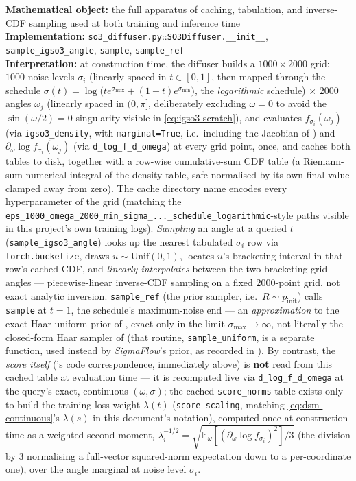 \documentclass[11pt,a4paper]{report}
\theoremstyle{definition}
\theoremstyle{remark}
\newcommand{\EE}{\mathbb E}
\newcommand{\file}[1]{\texttt{#1}}
\newcommand{\pyfunc}[1]{\texttt{#1}}
\begin{document}
\begin{codebox}
\textbf{Mathematical object:} the full apparatus of caching, tabulation,
and inverse-CDF sampling used at both training and inference time \\
\textbf{Implementation:} \file{so3\_diffuser.py}::\pyfunc{SO3Diffuser.\_\_init\_\_},
\pyfunc{sample\_igso3\_angle}, \pyfunc{sample}, \pyfunc{sample\_ref} \\
\textbf{Interpretation:} at construction time, the diffuser builds a
$1000\times2000$ grid: $1000$ noise levels $\sigma_i$ (linearly spaced in
$t\in[0,1]$, then mapped through the schedule
$\sigma(t)=\log\bigl(te^{\sigma_{\max}}+(1-t)e^{\sigma_{\min}}\bigr)$, the
\emph{logarithmic} schedule) $\times$ $2000$ angles $\omega_j$ (linearly
spaced in $(0,\pi]$, deliberately excluding $\omega=0$ to avoid the
$\sin(\omega/2)=0$ singularity visible in \eqref{eq:igso3-scratch}), and
evaluates $f_{\sigma_i}(\omega_j)$ (via \pyfunc{igso3\_density}, with
\texttt{marginal=True}, i.e.\ including the Jacobian of
) and
$\partial_{\omega}\log f_{\sigma_i}(\omega_j)$ (via
\pyfunc{d\_log\_f\_d\_omega}) at every grid point, once, and caches both
tables to disk, together with a row-wise cumulative-sum CDF table (a
Riemann-sum numerical integral of the density table, safe-normalised by
its own final value clamped away from zero). The cache directory name
encodes every hyperparameter of the grid (matching the
\texttt{eps\_1000\_omega\_2000\_min\_sigma\_...\_schedule\_logarithmic}-style
paths visible in this project's own training logs). \emph{Sampling} an
angle at a queried $t$ (\pyfunc{sample\_igso3\_angle}) looks up the nearest
tabulated $\sigma_i$ row via \pyfunc{torch.bucketize}, draws
$u\sim\mathrm{Unif}(0,1)$, locates $u$'s bracketing interval in that row's
cached CDF, and \emph{linearly interpolates} between the two bracketing
grid angles --- piecewise-linear inverse-CDF sampling on a fixed
$2000$-point grid, not exact analytic inversion. \pyfunc{sample\_ref} (the
prior sampler, i.e.\ $R\sim p_{\mathrm{init}}$) calls \pyfunc{sample} at
$t=1$, the schedule's maximum-noise end --- an \emph{approximation} to the
exact Haar-uniform prior of , exact only
in the limit $\sigma_{\max}\to\infty$, not literally the closed-form Haar
sampler of  (that routine, \pyfunc{sample\_uniform}, is
a separate function, used instead by \emph{SigmaFlow}'s prior, as recorded
in ). By contrast, the \emph{score itself}
('s code correspondence, immediately above)
is \textbf{not} read from this cached table at evaluation time --- it is
recomputed live via \pyfunc{d\_log\_f\_d\_omega} at the query's exact,
continuous $(\omega,\sigma)$; the cached \texttt{score\_norms} table exists
only to build the training loss-weight $\lambda(t)$
(\pyfunc{score\_scaling}, matching \eqref{eq:dsm-continuous}'s $\lambda(s)$
in this document's notation), computed once at construction time as a
weighted second moment,
$\lambda_i^{-1/2}=\sqrt{\EE_\omega[(\partial_\omega\log f_{\sigma_i})^2]/3}$
(the division by $3$ normalising a full-vector squared-norm expectation
down to a per-coordinate one), over the angle marginal at noise level
$\sigma_i$.
\end{codebox}
\end{document}
